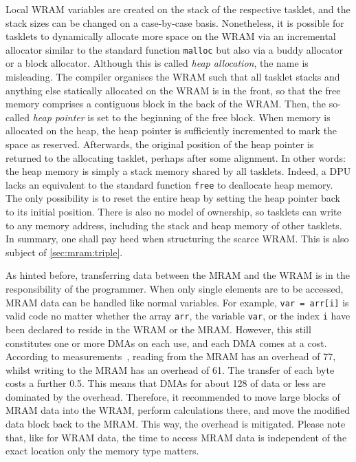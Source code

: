 Local \ac{WRAM} variables are created on the stack of the respective tasklet, and the stack sizes can be changed on a case-by-case basis.
Nonetheless, it is possible for tasklets to dynamically allocate more space on the \ac{WRAM} via an incremental allocator similar to the standard \langC{} function \lstinline|malloc| but also via a buddy allocator or a block allocator.
Although this is called \emph{heap allocation}, the name is misleading.
The compiler organises the \ac{WRAM} such that all tasklet stacks and anything else statically allocated on the \ac{WRAM} is in the front, so that the free memory comprises a contiguous block in the back of the \ac{WRAM}.
Then, the so-called \emph{heap pointer} is set to the beginning of the free block.
When memory is allocated on the heap, the heap pointer is sufficiently incremented to mark the space as reserved.
Afterwards, the original position of the heap pointer is returned to the allocating tasklet, perhaps after some alignment.
In other words:
the heap memory is simply a stack memory shared by all tasklets.
Indeed, a \ac{DPU} lacks an equivalent to the standard \langC{} function \lstinline|free| to deallocate heap memory.
The only possibility is to reset the entire heap by setting the heap pointer back to its initial position.
There is also no model of ownership, so tasklets can write to any memory address, including the stack and heap memory of other tasklets.
In summary, one shall pay heed when structuring the scarce \ac{WRAM}.
This is also subject of \cref{sec:mram:triple}.

As hinted before, transferring data between the \ac{MRAM} and the \ac{WRAM} is in the responsibility of the programmer.
When only single elements are to be accessed, \ac{MRAM} data can be handled like normal variables.
For example, \lstinline|var = arr[i]| is valid code no matter whether the array \lstinline|arr|, the variable \lstinline|var|, or the index \lstinline|i| have been declared to reside in the WRAM or the MRAM.
However, this still constitutes one or more \acp{DMA} on each use, and each \ac{DMA} comes at a cost.
According to measurements~\cite{mutlu2022Benchmarking}, reading from the \ac{MRAM} has an overhead of \qty{77}{\cycle}, whilst writing to the \ac{MRAM} has an overhead of \qty{61}{\cycle}.
The transfer of each byte costs a further \qty{0.5}{\cycle}.
This means that \acp{DMA} for about \qty{128}{\byte} of data or less are dominated by the overhead.
Therefore, it recommended to move large blocks of \ac{MRAM} data into the \ac{WRAM}, perform calculations there, and move the modified data block back to the \ac{MRAM}.
This way, the overhead is mitigated.
Please note that, like for \ac{WRAM} data, the time to access \ac{MRAM} data is independent of the exact location \Dash only the memory type matters.

